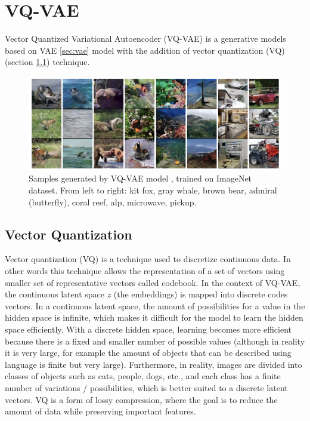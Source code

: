 \section{VQ-VAE}
\label{sec:vqvae}

Vector Quantized Variational Autoencoder (VQ-VAE) \cite{vqvae} is a generative models based on VAE \ref{sec:vae} model with the addition of vector quantization (VQ) (section \ref{subsec:vqvae_vq}) technique. 


\begin{figure}[h]
    \centering
    \includegraphics[width=\textwidth]{images/vqvae_samples.png}
    \caption{Samples generated by VQ-VAE model \cite{vqvae}, trained on ImageNet dataset. From left to right:  kit fox, gray whale, brown bear, admiral (butterfly), coral reef, alp, microwave, pickup.}
\end{figure}










\subsection{Vector Quantization}
\label{subsec:vqvae_vq}

Vector quantization (VQ) is a technique used to discretize continuous data. In other words this technique allows the representation of a set of vectors using smaller set of representative vectors called codebook. In the context of VQ-VAE, the continuous latent space $z$ (the embeddings) is mapped into discrete codes vectors. In a continuous latent space, the amount of possibilities for a value in the hidden space is infinite, which makes it difficult for the model to learn the hidden space efficiently. With a discrete hidden space, learning becomes more efficient because there is a fixed and smaller number of possible values (although in reality it is very large, for example the amount of objects that can be described using language is finite but very large). Furthermore, in reality, images are divided into classes of objects such as cats, people, dogs, etc., and each class has a finite number of variations / possibilities, which is better suited to a discrete latent vectors. VQ is a form of lossy compression, where the goal is to reduce the amount of data while preserving important features.

